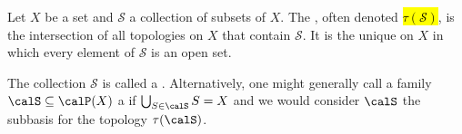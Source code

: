 \begin{definition} \label{definition:topology_on_a_set_generated_by_a_collection_of_subsets_and_subbasis_for_a_topology}
Let $X$ be a set and $\mathcal{S}$ a collection of subsets of $X$. The , often denoted \hl{$\tau(\mathcal{S})$}, is the intersection of all topologies on $X$ that contain $\mathcal{S}$. It is the unique  on $X$ in which every element of $\mathcal{S}$ is an open set.

The collection $\mathcal{S}$ is called a . Alternatively, one might generally call a family $\calS \subseteq \calP(X)$  a  if $\bigcup_{S \in \calS} S  = X$ and we would consider $\calS$ the subbasis for the topology $\tau(\calS)$.
\end{definition}